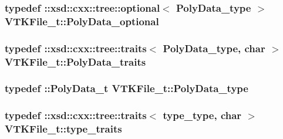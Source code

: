\subsubsection[{\texorpdfstring{Poly\+Data\+\_\+optional}{PolyData_optional}}]{\setlength{\rightskip}{0pt plus 5cm}typedef \+::xsd\+::cxx\+::tree\+::optional$<$ {\bf Poly\+Data\+\_\+type} $>$ {\bf V\+T\+K\+File\+\_\+t\+::\+Poly\+Data\+\_\+optional}}\hypertarget{classVTKFile__t_aacb796775ae228cd61726a23b809f3e4}{}\label{classVTKFile__t_aacb796775ae228cd61726a23b809f3e4}
\subsubsection[{\texorpdfstring{Poly\+Data\+\_\+traits}{PolyData_traits}}]{\setlength{\rightskip}{0pt plus 5cm}typedef \+::xsd\+::cxx\+::tree\+::traits$<$ {\bf Poly\+Data\+\_\+type}, char $>$ {\bf V\+T\+K\+File\+\_\+t\+::\+Poly\+Data\+\_\+traits}}\hypertarget{classVTKFile__t_aa5ad98f5709c1e9beec3804a7f42b5f6}{}\label{classVTKFile__t_aa5ad98f5709c1e9beec3804a7f42b5f6}
\subsubsection[{\texorpdfstring{Poly\+Data\+\_\+type}{PolyData_type}}]{\setlength{\rightskip}{0pt plus 5cm}typedef \+::{\bf Poly\+Data\+\_\+t} {\bf V\+T\+K\+File\+\_\+t\+::\+Poly\+Data\+\_\+type}}\hypertarget{classVTKFile__t_a4588b4f0e28ba09aa219bda7e1fc6c97}{}\label{classVTKFile__t_a4588b4f0e28ba09aa219bda7e1fc6c97}
\subsubsection[{\texorpdfstring{type\+\_\+traits}{type_traits}}]{\setlength{\rightskip}{0pt plus 5cm}typedef \+::xsd\+::cxx\+::tree\+::traits$<$ {\bf type\+\_\+type}, char $>$ {\bf V\+T\+K\+File\+\_\+t\+::type\+\_\+traits}}\hypertarget{classVTKFile__t_aee4ac167e843e9def1be4f43ad930391}{}\label{classVTKFile__t_aee4ac167e843e9def1be4f43ad930391}
